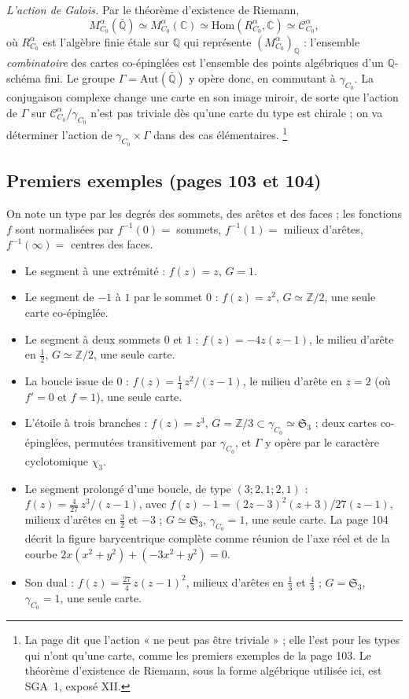 \documentclass[11pt,a4paper]{article}
\begin{document}
\emph{L'action de Galois.} Par le théorème d'existence de Riemann,
\[
M^{\alpha}_{C_{0}}(\bar{\mathbb{Q}}) \simeq M^{\alpha}_{C_{0}}(\mathbb{C}) \simeq
\mathrm{Hom}(R^{\alpha}_{C_{0}}, \mathbb{C}) \simeq \mathcal{C}^{\alpha}_{C_{0}},
\]
où $R^{\alpha}_{C_{0}}$ est l'algèbre finie étale sur $\mathbb{Q}$ qui représente
$(M^{\alpha}_{C_{0}})_{\mathbb{Q}}$ : l'ensemble \emph{combinatoire} des cartes
co-épinglées est l'ensemble des points algébriques d'un $\mathbb{Q}$-schéma fini.
Le groupe $\Gamma = \mathrm{Aut}(\bar{\mathbb{Q}})$ y opère donc, en commutant à
$\gamma_{C_{0}}$. La conjugaison complexe change une carte en son image miroir,
de sorte que l'action de $\Gamma$ sur $\mathcal{C}^{\alpha}_{C_{0}}/\gamma_{C_{0}}$
n'est pas triviale dès qu'une carte du type est chirale ; on va déterminer
l'action de $\gamma_{C_{0}} \times \Gamma$ dans des cas élémentaires.%
\footnote{La page dit que l'action « ne peut pas être triviale » ; elle l'est
pour les types qui n'ont qu'une carte, comme les premiers exemples de la page
103. Le théorème d'existence de Riemann, sous la forme algébrique utilisée ici, est
SGA~1, exposé XII.}

\subsection*{Premiers exemples (pages 103 et 104)}

On note un type par les degrés des sommets, des arêtes et des faces ; les
fonctions $f$ sont normalisées par $f^{-1}(0) =$ sommets, $f^{-1}(1) =$ milieux
d'arêtes, $f^{-1}(\infty) =$ centres des faces.

\begin{itemize}
\item Le segment à une extrémité : $f(z) = z$, $G = 1$.
\item Le segment de $-1$ à $1$ par le sommet $0$ : $f(z) = z^{2}$, $G \simeq
\mathbb{Z}/2$, une seule carte co-épinglée.
\item Le segment à deux sommets $0$ et $1$ : $f(z) = -4z(z-1)$, le milieu
d'arête en $\tfrac12$, $G \simeq \mathbb{Z}/2$, une seule carte.
\item La boucle issue de $0$ : $f(z) = \tfrac14\, z^{2}/(z-1)$, le milieu d'arête
en $z = 2$ (où $f' = 0$ et $f = 1$), une seule carte.
\item L'étoile à trois branches : $f(z) = z^{3}$, $G = \mathbb{Z}/3 \subset
\gamma_{C_{0}} \simeq \mathfrak{S}_{3}$ ; deux cartes co-épinglées, permutées
transitivement par $\gamma_{C_{0}}$, et $\Gamma$ y opère par le caractère
cyclotomique $\chi_{3}$.
\item Le segment prolongé d'une boucle, de type $(3 ; 2, 1 ; 2, 1)$ :
$f(z) = \tfrac{4}{27}\, z^{3}/(z-1)$, avec $f(z) - 1 = (2z-3)^{2}(z+3)/27(z-1)$,
milieux d'arêtes en $\tfrac32$ et $-3$ ; $G \simeq \mathfrak{S}_{3}$,
$\gamma_{C_{0}} = 1$, une seule carte. La page 104 décrit la figure barycentrique
complète comme réunion de l'axe réel et de la courbe $2x(x^{2} + y^{2}) +
(-3x^{2} + y^{2}) = 0$.
\item Son dual : $f(z) = \tfrac{27}{4}\, z(z-1)^{2}$, milieux d'arêtes en
$\tfrac13$ et $\tfrac43$ ; $G = \mathfrak{S}_{3}$, $\gamma_{C_{0}} = 1$, une seule
carte.
\end{itemize}
\end{document}
